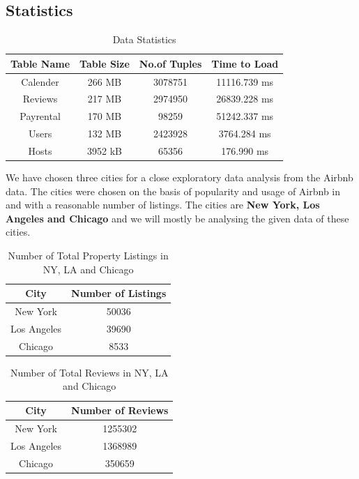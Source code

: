 \documentclass[10pt]{article}
\begin{document}
\subsection{Statistics}
\begin{table}[!htbp]
\begin{center}
 \begin{tabular}{||c c c c||} 
 \hline
 Table Name & Table Size & No.of Tuples & Time to Load \\ [0.5ex] 
 \hline
Calender    & 266 MB       &    3078751  &  11116.739 ms  \\ 
 \hline
Reviews     & 217 MB        &    2974950  &  26839.228 ms \\
 \hline
 Payrental   & 170 MB       &      98259    &  51242.337 ms\\
 \hline
 Users         & 132 MB       &    2423928  &  3764.284 ms\\
 \hline
 Hosts         & 3952 kB      &      65356     &  176.990 ms\\
 \hline
\end{tabular}
\caption {Data Statistics}
\end{center}
\end{table}

We have chosen three cities for a close exploratory data analysis from the Airbnb data. The cities were chosen on the basis of popularity and usage of Airbnb in and with a reasonable number of listings. The cities are \textbf{New York, Los Angeles and Chicago} and we will mostly be analysing the given data of these cities. 

\begin{table}[!htbp]
\begin{center}
 \begin{tabular}{||c c||} 
 \hline
 City & Number of Listings \\ [0.5ex] 
 \hline
 New York & 50036  \\ 
 \hline
 Los Angeles & 39690 \\
 \hline
 Chicago &  8533\\
 \hline
\end{tabular}
\caption {Number of Total Property Listings in NY, LA and Chicago}
\end{center}
\end{table}

\begin{table}[!htbp]
\begin{center}
 \begin{tabular}{||c c||} 
 \hline
 City & Number of Reviews \\ [0.5ex] 
 \hline
 New York & 1255302  \\ 
 \hline
 Los Angeles & 1368989 \\
 \hline
 Chicago &  350659\\
 \hline
\end{tabular}
\caption {Number of Total Reviews in NY, LA and Chicago}
\end{center}
\end{table}
\end{document}
